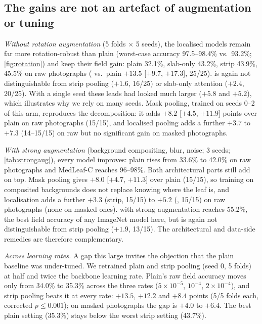 \begin{table}[t]
\centering
\caption{Pre-specified contrasts on field photographs (ConvNeXt-T, 25 matched runs). $\Delta$ in
accuracy points with runs won; 95\% intervals from the corrected resampled $t$-test over runs and from
a bootstrap over runs and field species; $p$ Holm-corrected within each family. $^\dagger$equivalent to zero
within $\pm3$ points (two one-sided tests, $p<0.05$).}
\label{tab:contrasts}
\small
\resizebox{\linewidth}{!}{}
\end{table}

\subsection{The gains are not an artefact of augmentation or tuning}
\label{sec:norot}
\label{sec:strongaug}
\emph{Without rotation augmentation} (5 folds $\times$ 5 seeds), the localised models remain far more
rotation-robust than plain (worst-case accuracy 97.5--98.4\% vs.\ 93.2\%; \cref{fig:rotation}) and
keep their field gain: plain 32.1\%, slab-only 43.2\%, strip 43.9\%, \SVA{} 45.5\% on raw photographs
(\SVA{} vs.\ plain $+13.5$ [$+9.7$, $+17.3$], 25/25). \SVA{} is again not distinguishable from strip
pooling ($+1.6$, 16/25) or slab-only attention ($+2.4$, 20/25). With a single seed these leads had
looked much larger ($+5.8$ and $+5.2$), which illustrates why we rely on many seeds. Mask pooling, trained on seeds 0--2 of this arm, reproduces the decomposition: it adds $+8.2$ [$+4.5$, $+11.9$] points over plain on raw photographs (15/15), and localised pooling adds a further $+3.7$ to $+7.3$ (14--15/15) on raw but no significant gain on masked photographs.

\emph{With strong augmentation} (background compositing, blur, noise; 3 seeds; \cref{tab:strongaug}),
every model improves: plain rises from 33.6\% to 42.0\% on raw photographs and MedLeaf-C reaches
96--98\%. Both architectural parts still add on top. Mask pooling gives $+8.0$ [$+4.7$, $+11.3$] over
plain (15/15), so training on composited backgrounds does not replace knowing where the leaf is, and
localisation adds a further $+3.3$ (strip, 15/15) to $+5.2$ (\SVA{}, 15/15) on raw photographs (none on
masked ones). \SVA{} with strong augmentation reaches 55.2\%, the best field accuracy of any ImageNet
model here, but is again not distinguishable from strip pooling ($+1.9$, 13/15). The architectural
and data-side remedies are therefore complementary.

\emph{Across learning rates.} A gap this large invites the objection that the plain baseline was
under-tuned. We retrained plain and strip pooling (seed 0, 5 folds) at half and twice the backbone
learning rate. Plain's raw field accuracy moves only from 34.0\% to 35.3\% across the three rates
($5\times10^{-5}$, $10^{-4}$, $2\times10^{-4}$), and strip pooling beats it at every rate: $+13.5$, $+12.2$ and
$+8.4$ points (5/5 folds each, corrected $p\le0.001$); on masked photographs the gap is $+4.0$ to $+6.4$.
The best plain setting (35.3\%) stays below the worst strip setting (43.7\%).


